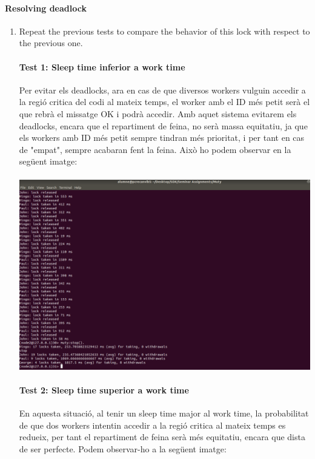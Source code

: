 \documentclass[a4paper, 10pt]{article}
\begin{document}
\newpage\paragraph[bold]{Resolving deadlock}
\begin{enumerate}
\item Repeat the previous tests to compare the behavior of this lock with respect to the previous one.
\paragraph[bold]{Test 1: Sleep time inferior a work time}

Per evitar els deadlocks, ara en cas de que diversos workers vulguin accedir a la regió critica del codi al mateix temps, el worker amb el ID més petit serà el que rebrà el missatge OK i podrà accedir. Amb aquet sistema evitarem els deadlocks, encara que el repartiment de feina, no serà massa equitatiu, ja que els workers amb ID més petit sempre tindran més prioritat, i per tant en cas de "empat", sempre acabaran fent la feina. Això ho podem observar en la següent imatge:\\\\

\includegraphics[width=\textwidth]{lock-1}
\newpage


\paragraph[bold]{Test 2: Sleep time superior a work time}

En aquesta situació, al tenir un sleep time major al work time, la probabilitat de que dos workers intentin accedir a la regió critica al mateix temps es redueix, per tant el repartiment de feina serà més equitatiu, encara que dista de ser perfecte. Podem observar-ho a la següent imatge:\\\\


\end{enumerate}
\end{document}
